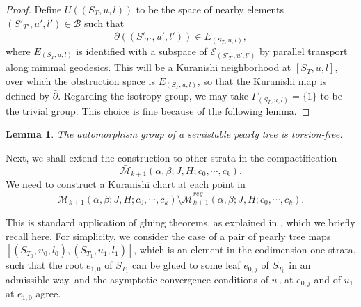 \documentclass{amsart}
\newtheorem{lemma}[theorem]{Lemma}
\numberwithin{equation}{section}
\numberwithin{figure}{section}
\begin{document}
\begin{proof}
	Define $U((S_{T}, u, l))$ to be the space of nearby elements $(S'_{T'}, u', l') \in \mathcal{B}$ such that
\begin{equation}
\bar{\partial}((S'_{T'}, u', l')) \in E_{(S_{T}, u, l)},
\end{equation}
where $E_{(S_{T}, u, l)}$ is identified with a subspace of $\mathcal{E}_{(S'_{T'}, u', l')}$ by parallel transport along minimal geodesics. This will be a Kuranishi neighborhood at $[S_{T}, u, l]$, over which the obstruction space is $E_{(S_{T}, u, l)}$, so that the Kuranishi map is defined by $\bar{\partial}$. Regarding the isotropy group, we may take $\Gamma_{(S_{T}, u, l)} = \{1\}$ to be the trivial group. This choice is fine because of the following lemma. \par
\end{proof}

\begin{lemma}
	The automorphism group of a semistable pearly tree is torsion-free.
\end{lemma}

	Next, we shall extend the construction to other strata in the compactification 
\begin{displaymath}
\bar{\mathcal{M}}_{k+1}(\alpha, \beta; J, H; c_{0}, \cdots, c_{k}).
\end{displaymath}
We need to construct a Kuranishi chart at each point in 
\begin{displaymath}
\bar{\mathcal{M}}_{k+1}(\alpha, \beta; J, H; c_{0}, \cdots, c_{k}) \setminus \bar{\mathcal{M}}^{reg}_{k+1}(\alpha, \beta; J, H; c_{0}, \cdots, c_{k}).
\end{displaymath}\par

	This is standard application of gluing theorems, as explained in \cite{FOOO2}, which we briefly recall here. For simplicity, we consider the case of a pair of pearly tree maps $[(S_{T_{0}}, u_{0}, l_{0}), (S_{T_{1}}, u_{1}, l_{1})]$, which is an element in the codimension-one strata, such that the root $e_{1, 0}$ of $S_{T_{1}}$ can be glued to some leaf $e_{0, j}$ of $S_{T_{0}}$ in an admissible way, and the asymptotic convergence conditions of $u_{0}$ at $e_{0, j}$ and of $u_{1}$ at $e_{1, 0}$ agree. \par
\end{document}
